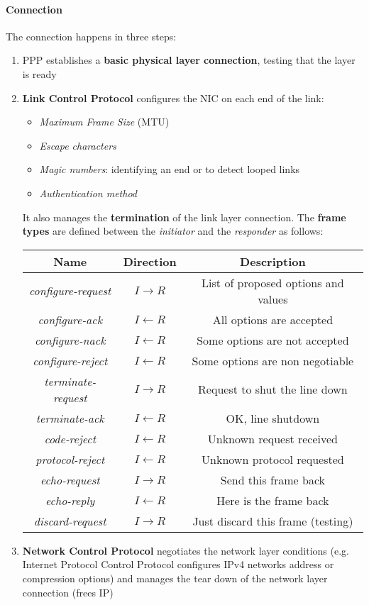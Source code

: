 \paragraph{Connection} The connection happens in three steps:
\begin{enumerate}
	\item PPP establishes a \textbf{basic physical layer connection}, testing that the layer is ready
	\item \textbf{Link Control Protocol} configures the NIC on each end of the link:
	\begin{itemize}
		\item \textit{Maximum Frame Size} (MTU)
		\item \textit{Escape characters}
		\item \textit{Magic numbers}: identifying an end or to detect looped links
		\item \textit{Authentication method}
	\end{itemize}
	It also manages the \textbf{termination} of the link layer connection.
	\newpage
	The \textbf{frame types} are defined between the \textit{initiator} and the \textit{responder} as follows:
	\begin{table}[!h]
		\centering
		\begin{tabular}{|c|c|c|}
			\hline
			\textbf{Name} & \textbf{Direction} & \textbf{Description}\\
			\hline
			\textit{configure-request} & $I \to R$ & List of proposed options and values \\
			\hline
			\textit{configure-ack} & $I \leftarrow R$ & All options are accepted \\
			\hline
			\textit{configure-nack}& $I \leftarrow R$ & Some options are not accepted \\
			\hline
			\textit{configure-reject} & $I \leftarrow R$ & Some options are non negotiable \\
			\hline
			\textit{terminate-request} & $I \to R$ & Request to shut the line down \\
			\hline
			\textit{terminate-ack} & $I \leftarrow R$ & OK, line shutdown \\
			\hline
			\textit{code-reject} & $I \leftarrow R$ & Unknown request received \\
			\hline
			\textit{protocol-reject} & $I \leftarrow R$ & Unknown protocol requested \\
			\hline
			\textit{echo-request} & $I \to R$ & Send this frame back \\
			\hline
			\textit{echo-reply} & $I \leftarrow R$ & Here is the frame back \\
			\hline
			\textit{discard-request} & $I \to R$ & Just discard this frame (testing)\\
			\hline
		\end{tabular}
	\end{table}
	\item \textbf{Network Control Protocol} negotiates the network layer conditions (e.g. Internet Protocol Control Protocol configures IPv4 networks address or compression options) and manages the tear down of the network layer connection (frees IP)
\end{enumerate}

